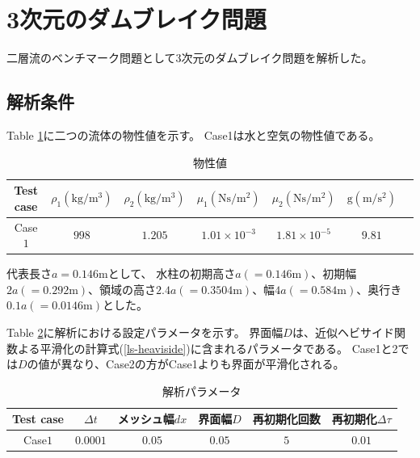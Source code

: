 \newpage
\section{3次元のダムブレイク問題}
二層流のベンチマーク問題として3次元のダムブレイク問題を解析した。

\subsection{解析条件}

Table \ref{table:dambreak-material-property}に二つの流体の物性値を示す。
Case1は水と空気の物性値である。
\renewcommand{\arraystretch}{1}
\begin{table}[H]
	\centering
	\caption{物性値}
	\begin{tabular}{ccccccc}
		\hline
		Test case & $\rho_1 (\mathrm{kg/m^3})$ & $\rho_2 (\mathrm{kg/m^3})$ & $\mu_1 (\mathrm{Ns/m^2})$& $\mu_2 (\mathrm{Ns/m^2})$ & $\mathrm{g} (\mathrm{m/s^2})$ \\
		\hline 
		Case$1$ & $998$ & $1.205$   & $1.01\times10^{-3}$ & $1.81\times10^{-5}$ & $9.81$ \\
		\hline         
	\end{tabular}
	\label{table:dambreak-material-property}
\end{table}
\renewcommand{\arraystretch}{1.0}

代表長さ$a=0.146 \mathrm{m}$として、
水柱の初期高さ$a(=0.146\mathrm{m})$、初期幅$2a(=0.292\mathrm{m})$、領域の高さ$2.4a(=0.3504\mathrm{m})$、幅$4a(=0.584\mathrm{m})$、奥行き$0.1a(=0.0146\mathrm{m})$とした。

Table \ref{table:dambreak-parameter}に解析における設定パラメータを示す。
界面幅$D$は、近似ヘビサイド関数よる平滑化の計算式(\ref{ls-heaviside})に含まれるパラメータである。
Case1と2では$D$の値が異なり、Case2の方がCase1よりも界面が平滑化される。
\renewcommand{\arraystretch}{1}
\begin{table}[H]
	\centering
	\caption{解析パラメータ}
	\begin{tabular}{cccccc}
		\hline
		Test case & $\Delta t$ & メッシュ幅$dx$ & 界面幅$D$ & 再初期化回数 & 再初期化$\Delta \tau$\\
		\hline 
		Case$1$ & $0.0001$ & $0.05$ & $0.05$ & $5$ & $0.01$\\
		\hline         
	\end{tabular}
	\label{table:dambreak-parameter}
\end{table}
\renewcommand{\arraystretch}{1.0}

